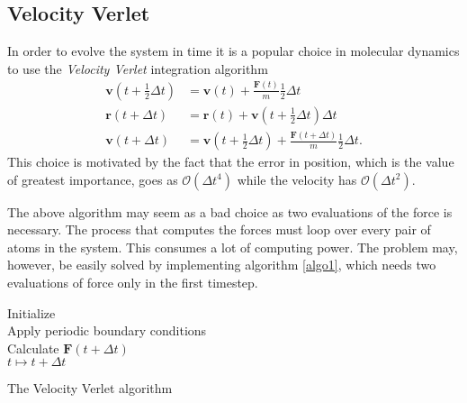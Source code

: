 \documentclass[twoside,utf8]{article}
\newcommand{\EQU}[1] { \begin{equation*} \begin{split} #1 \end{split} \end{equation*} }
\begin{document}
\begin{multicols}{2}
\subsection{Velocity Verlet}
In order to evolve the system in time it is a popular choice in molecular dynamics to use the \textit{Velocity Verlet} integration algorithm
\EQU{
\mathbf{v}\left(t+\frac{1}{2}\Delta t \right)  &=\mathbf{v}(t)+\frac{\mathbf{F}(t)}{m}\frac{1}{2}\Delta t \\
\mathbf{r}(t+\Delta t )&=\mathbf{r}(t)+\mathbf{v}\left( t+\frac{1}{2}\Delta t \right)\Delta t \\
\mathbf{v}\left(t+\Delta t \right)&=\mathbf{v}\left(t+\frac{1}{2}\Delta t \right)+\frac{\mathbf{F}\left(t+\Delta t\right)}{m}\frac{1}{2}\Delta t.
}
This choice is motivated by the fact that the error in position, which is the value of greatest importance, goes as $\mathcal{O}(\Delta t^4)$ while the velocity has $\mathcal{O}(\Delta t^2)$. 

The above algorithm may seem as a bad choice as two evaluations of the force is necessary. The process that computes the forces must loop over every pair of atoms in the system. This consumes a lot of computing power. The problem may, however, be easily solved by implementing algorithm \ref*{algo1}, which needs two evaluations of force only in the first timestep.

\begin{algorithm}[H]
\label{algo1}
 Initialize \\
 Apply periodic boundary conditions \\
 Calculate $\mathbf{F}(t+\Delta t )$ \\
  $t \mapsto t+\Delta t$
 \caption{The Velocity Verlet algorithm}
\end{algorithm}



\end{multicols}
\end{document}
